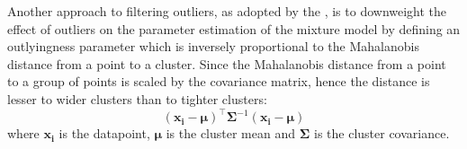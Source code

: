 

Another approach to filtering outliers, as adopted by the , is to downweight the effect of outliers on the parameter estimation of the mixture model by defining an outlyingness parameter which is inversely proportional to the Mahalanobis distance from a point to a cluster.  
Since the Mahalanobis distance from a point to a group of points is scaled by the covariance matrix, hence the distance is lesser to wider clusters than to tighter clusters:
\begin{equation} \label{equation:Mahalanobis}
(\boldsymbol{x_i}-\boldsymbol{\mu})^{\top}\boldsymbol{\Sigma}^{-1}(\boldsymbol{x_i}-\boldsymbol{\mu})
\end{equation}
where $\boldsymbol{x_i}$ is the datapoint, $\boldsymbol{\mu}$ is the cluster mean and $\boldsymbol{\Sigma}$ is the cluster covariance.

